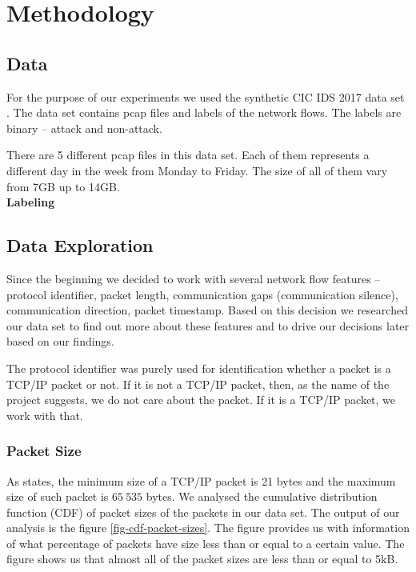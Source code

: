 \documentclass{article}
\begin{document}
\section{Methodology}
\subsection{Data}
For the purpose of our experiments we used the synthetic CIC IDS 2017 data set \cite{sharafaldin2018toward}. The data set contains pcap files and labels of the network flows. The labels are binary -- attack and non-attack.

There are 5 different pcap files in this data set. Each of them represents a different day in the week from Monday to Friday. The size of all of them vary from 7GB up to 14GB.\\

\noindent\textbf{Labeling}\\


\subsection{Data Exploration}\label{sec-dataset-exploration}
Since the beginning we decided to work with several network flow features -- protocol identifier, packet length, communication gaps (communication silence), communication direction, packet timestamp. Based on this decision we researched our data set to find out more about these features and to drive our decisions later based on our findings.

The protocol identifier was purely used for identification whether a packet is a TCP/IP packet or not. If it is not a TCP/IP packet, then, as the name of the project suggests, we do not care about the packet. If it is a TCP/IP packet, we work with that.

\subsubsection{Packet Size}
As \cite{oreilly-tcp} states, the minimum size of a TCP/IP packet is 21 bytes and the maximum size of such packet is $65\ 535$ bytes. We analysed the cumulative distribution function (CDF) of packet sizes of the packets in our data set. The output of our analysis is the figure \ref{fig-cdf-packet-sizes}. The figure provides us with information of what percentage of packets have size less than or equal to a certain value. The figure shows us that almost all of the packet sizes are less than or equal to 5kB.
\end{document}
